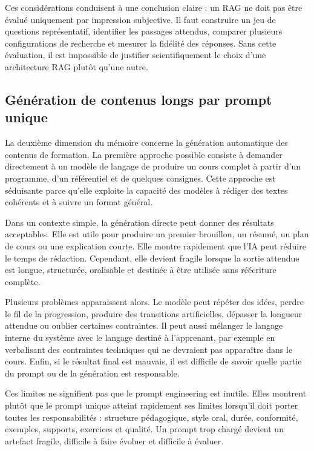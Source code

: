 Ces considérations conduisent à une conclusion claire : un RAG ne doit pas être évalué
uniquement par impression subjective. Il faut construire un jeu de questions représentatif,
identifier les passages attendus, comparer plusieurs configurations de recherche et
mesurer la fidélité des réponses. Sans cette évaluation, il est impossible de justifier
scientifiquement le choix d'une architecture RAG plutôt qu'une autre.

\subsection{Génération de contenus longs par prompt unique}

La deuxième dimension du mémoire concerne la génération automatique des contenus de
formation. La première approche possible consiste à demander directement à un modèle
de langage de produire un cours complet à partir d'un programme, d'un référentiel et de
quelques consignes. Cette approche est séduisante parce qu'elle exploite la capacité des
modèles à rédiger des textes cohérents et à suivre un format général.

Dans un contexte simple, la génération directe peut donner des résultats acceptables. Elle
est utile pour produire un premier brouillon, un résumé, un plan de cours ou une
explication courte. Elle montre rapidement que l'IA peut réduire le temps de rédaction.
Cependant, elle devient fragile lorsque la sortie attendue est longue, structurée,
oralisable et destinée à être utilisée sans réécriture complète.

Plusieurs problèmes apparaissent alors. Le modèle peut répéter des idées, perdre le fil de
la progression, produire des transitions artificielles, dépasser la longueur attendue ou
oublier certaines contraintes. Il peut aussi mélanger le langage interne du système avec
le langage destiné à l'apprenant, par exemple en verbalisant des contraintes techniques
qui ne devraient pas apparaître dans le cours. Enfin, si le résultat final est mauvais, il est
difficile de savoir quelle partie du prompt ou de la génération est responsable.

Ces limites ne signifient pas que le prompt engineering est inutile. Elles montrent plutôt
que le prompt unique atteint rapidement ses limites lorsqu'il doit porter toutes les
responsabilités : structure pédagogique, style oral, durée, conformité, exemples,
supports, exercices et qualité. Un prompt trop chargé devient un artefact fragile, difficile
à faire évoluer et difficile à évaluer.

